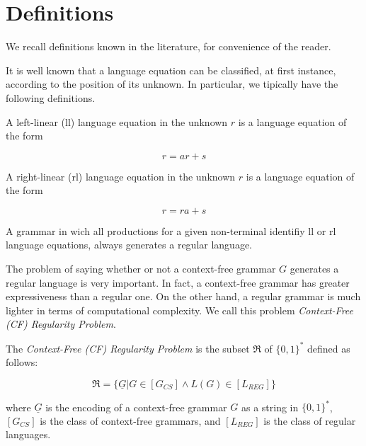 \section{Definitions}
\label{sec:definitions}

We recall definitions known in the literature, for convenience of the reader.

It is well known that a language equation can be classified, at first instance,
according to the position of its unknown.
In  particular, we tipically have the following definitions.

\begin{definition}
	\label{dfn:ll-language-equation}
	A left-linear (ll) language equation in the unknown $r$ is a language
	equation of the form

	\begin{equation}
	\label{eqn:ll-language}
	r=ar+s
	\end{equation}
\end{definition}

\begin{definition}
	\label{dfn:rl-language-equation}
	A right-linear (rl) language equation in the unknown $r$ is a language
	equation of the form

	\begin{equation}
	\label{eqn:rl-language}
	r=ra+s
	\end{equation}
\end{definition}

A grammar in wich all productions for a given non-terminal identifiy ll or rl
language equations, always generates a regular language.

The problem of saying whether or not a context-free grammar $G$ generates a
regular language is very important.
In fact, a context-free grammar has greater expressiveness than a regular one.
On the other hand, a regular grammar is much lighter in terms of computational
complexity.
We call this problem \textit{Context-Free (CF) Regularity Problem}.

\begin{definition}
	\label{dfn:cf-regularity-problem}
	The \textit{Context-Free (CF) Regularity Problem} is the subset
	$\Re$ of $\{0,1\}^{*}$ defined as follows:

	\begin{equation}
	\label{eqn:cf-regularity-problem}
	\Re=\{\underline{G}|G\in[G_{CS}]\wedge L(G)\in[L_{REG}]\}
	\end{equation}

	where $\underline{G}$ is the encoding of a context-free grammar $G$ as a
	string in $\{0,1\}^{*}$, $[G_{CS}]$ is the class of context-free grammars,
	and $[L_{REG}]$ is the class of regular languages.
\end{definition}

